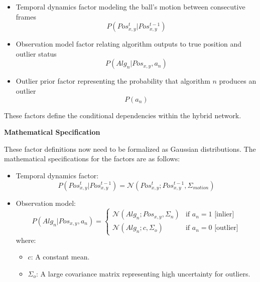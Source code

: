 \documentclass[12pt,a4paper]{article}
\begin{document}
\begin{itemize}
	\item Temporal dynamics factor modeling the ball's motion between consecutive frames
	\begin{equation}P(Pos_{x,y}^t | Pos_{x,y}^{t-1})\end{equation}
	\item Observation model factor relating algorithm outputs to true position and outlier status
	\begin{equation}P(Alg_n | Pos_{x,y}, a_n)\end{equation}
	\item Outlier prior factor representing the probability that algorithm $n$ produces an outlier
	\begin{equation}P(a_n)\end{equation} 
\end{itemize}

These factors define the conditional dependencies within the hybrid network.

\textbf{Mathematical Specification}

These factor definitions now need to be formalized as Gaussian distributions. The mathematical specifications for the factors are as follows:

\begin{itemize}
	\item Temporal dynamics factor:
	\begin{equation} P(Pos_{x,y}^t | Pos_{x,y}^{t-1}) = \mathcal{N}(Pos_{x,y}^t; Pos_{x,y}^{t-1}, \Sigma_{motion}) \end{equation}
	\item Observation model:
	\begin{equation}
	P(Alg_n | Pos_{x,y}, a_n) = \begin{cases}
	\mathcal{N}(Alg_n; Pos_{x,y}, \Sigma_n) & \text{if } a_n = 1 \text{ [inlier]} \\
	\mathcal{N}(Alg_n; c, \Sigma_o) & \text{if } a_n = 0 \text{ [outlier]}
	\end{cases}
	\end{equation}
	where:
	\begin{itemize}
		\item $c$: A constant mean.
		\item $\Sigma_o$: A large covariance matrix representing high uncertainty for outliers.
	\end{itemize}
\end{itemize}
\end{document}
